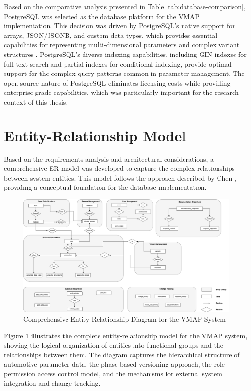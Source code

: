 Based on the comparative analysis presented in Table \ref{tab:database-comparison}, PostgreSQL was selected as the database platform for the \ac{VMAP} implementation. This decision was driven by PostgreSQL's native support for arrays, JSON/JSONB, and custom data types, which provides essential capabilities for representing multi-dimensional parameters and complex variant structures \cite{shaik2020postgresql}. PostgreSQL's diverse indexing capabilities, including GIN indexes for full-text search and partial indexes for conditional indexing, provide optimal support for the complex query patterns common in parameter management. The open-source nature of PostgreSQL eliminates licensing costs while providing enterprise-grade capabilities, which was particularly important for the research context of this thesis.

\section{Entity-Relationship Model}
\label{sec:entity-relationship-model}

Based on the requirements analysis and architectural considerations, a comprehensive \ac{ER} model was developed to capture the complex relationships between system entities. This model follows the approach described by Chen \cite{chen1976entity}, providing a conceptual foundation for the database implementation.

\begin{figure}[h]
\centering
\includegraphics[width=1.0\textwidth]{figures/vmap_er_diagram.png}
\caption{Comprehensive Entity-Relationship Diagram for the \ac{VMAP} System}
\label{fig}
\end{figure}

Figure \ref{fig} illustrates the complete entity-relationship model for the \ac{VMAP} system, showing the logical organization of entities into functional groups and the relationships between them. The diagram captures the hierarchical structure of automotive parameter data, the phase-based versioning approach, the role-permission access control model, and the mechanisms for external system integration and change tracking.

